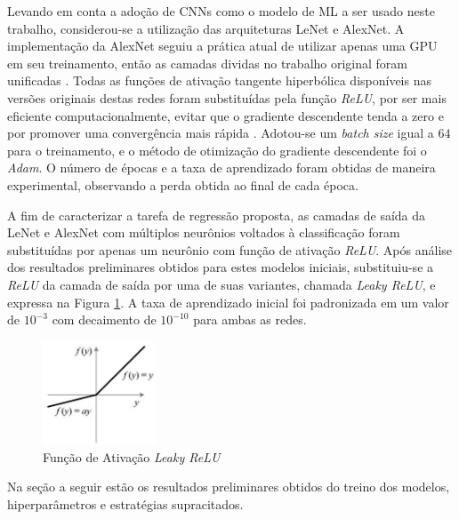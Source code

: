 Levando em conta a adoção de CNNs como o modelo de ML a ser usado neste trabalho, considerou-se a utilização das arquiteturas LeNet e AlexNet. A implementação da AlexNet seguiu a prática atual de utilizar apenas uma GPU em seu treinamento, então as camadas dividas no trabalho original foram unificadas \cite{tensorflow:alexnet}. Todas as funções de ativação tangente hiperbólica disponíveis nas versões originais destas redes foram substituídas pela função \emph{ReLU}, por ser mais eficiente computacionalmente, evitar que o gradiente descendente tenda a zero e por promover uma convergência mais rápida \cite{maas2013rectifier}. Adotou-se um \emph{batch size} igual a $64$ para o treinamento, e o método de otimização do gradiente descendente foi o \emph{Adam}. O número de épocas e a taxa de aprendizado foram obtidas de maneira experimental, observando a perda obtida ao final de cada época.

A fim de caracterizar a tarefa de regressão proposta, as camadas de saída da LeNet e AlexNet com múltiplos neurônios voltados à classificação foram substituídas por apenas um neurônio com função de ativação \emph{ReLU}. Após análise dos resultados preliminares obtidos para estes modelos iniciais, substituiu-se a \emph{ReLU} da camada de saída por uma de suas variantes, chamada \emph{Leaky ReLU}, e expressa na Figura \ref{fig:lrelu}. A taxa de aprendizado inicial foi padronizada em um valor de $10^{-3}$ com decaimento de $10^{-10}$ para ambas as redes.

\begin{figure}[!ht]
     \centering
     \includegraphics[width=0.3\textwidth]{img/lrelu}
     \caption{Função de Ativação \emph{Leaky ReLU}}
     \label{fig:lrelu}
\end{figure}

Na seção a seguir estão os resultados preliminares obtidos do treino dos modelos, hiperparâmetros e estratégias supracitados.
